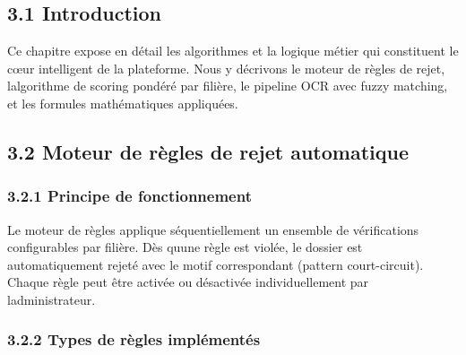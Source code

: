 \documentclass[
]{article}
\begin{document}
\hypertarget{introduction-2}{%
\subsection{3.1 Introduction}\label{introduction-2}}

Ce chapitre expose en détail les algorithmes et la logique métier qui
constituent le cœur intelligent de la plateforme. Nous y décrivons le
moteur de règles de rejet, l\textquotesingle algorithme de scoring
pondéré par filière, le pipeline OCR avec fuzzy matching, et les
formules mathématiques appliquées.

\hypertarget{moteur-de-ruxe8gles-de-rejet-automatique}{%
\subsection{3.2 Moteur de règles de rejet
automatique}\label{moteur-de-ruxe8gles-de-rejet-automatique}}

\hypertarget{principe-de-fonctionnement}{%
\subsubsection{3.2.1 Principe de
fonctionnement}\label{principe-de-fonctionnement}}

Le moteur de règles applique séquentiellement un ensemble de
vérifications configurables par filière. Dès qu\textquotesingle une
règle est violée, le dossier est automatiquement rejeté avec le motif
correspondant (pattern court-circuit). Chaque règle peut être activée ou
désactivée individuellement par l\textquotesingle administrateur.

\hypertarget{types-de-ruxe8gles-impluxe9mentuxe9s}{%
\subsubsection{3.2.2 Types de règles
implémentés}\label{types-de-ruxe8gles-impluxe9mentuxe9s}}
\end{document}
